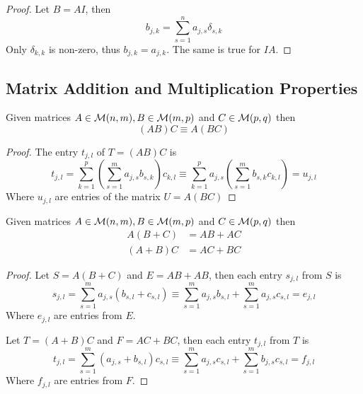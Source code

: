 \begin{proof}
    Let $B = AI$, then
    \begin{equation}
        b_{j, k} = \sum\limits^{n}_{s = 1} a_{j, s} \delta_{s, k}
    \end{equation}
    Only $\delta_{k, k}$ is non-zero, thus $b_{j, k} = a_{j, k}$. The same is true for $IA$.
\end{proof}

\subsection{Matrix Addition and Multiplication Properties}

\begin{proposition}
    Given matrices $A \in \mathcal{M}(n, m), B \in \mathcal{M}(m, p)$ and $C \in \mathcal{M}(p, q)$ then
    \begin{equation}
        (A B) C \equiv A (B C)
    \end{equation}
\end{proposition}

\begin{proof}
    The entry $t_{j, l}$ of $T = (A B) C$ is
    \begin{equation}
        t_{j, l} = \sum^{p}_{k = 1} \left( \sum^{m}_{s = 1} a_{j, s} b_{s, k} \right) c_{k, l} \equiv \sum^{p}_{k = 1} a_{j, s} \left( \sum^{m}_{s = 1} b_{s, k} c_{k, l} \right) = u_{j, l}
    \end{equation}
    Where $u_{j, l}$ are entries of the matrix $U = A (B C)$
\end{proof}

\begin{proposition}
    Given matrices $A \in \mathcal{M}(n, m), B \in \mathcal{M}(m, p)$ and $C \in \mathcal{M}(p, q)$ then
    \begin{align}
        A (B + C) &= A B + A C \\
        (A + B) C &= A C + B C
    \end{align}
\end{proposition}

\begin{proof}
    Let $S = A (B + C)$ and $E = A B + A B$, then each entry $s_{j, l}$ from $S$ is
    \begin{equation}
        s_{j, l} = \sum\limits^{m}_{s = 1} a_{j, s} ( b_{s, l} + c_{s, l} ) \equiv \sum\limits^{m}_{s = 1} a_{j, s} b_{s, l} + \sum\limits^{m}_{s = 1} a_{j, s} c_{s, l} = e_{j, l}
    \end{equation}
    Where $e_{j, l}$ are entries from $E$.
    
    Let $T = (A + B) C$ and $F = A C + B C$, then each entry $t_{j, l}$ from $T$ is
    \begin{equation}
        t_{j, l} = \sum\limits^{m}_{s = 1} (a_{j, s} + b_{s, l}) c_{s, l}\equiv \sum\limits^{m}_{s = 1} a_{j, s} c_{s, l} + \sum\limits^{m}_{s = 1} b_{j, s} c_{s, l} = f_{j, l}
    \end{equation}
    Where $f_{j, l}$ are entries from $F$.
\end{proof}

